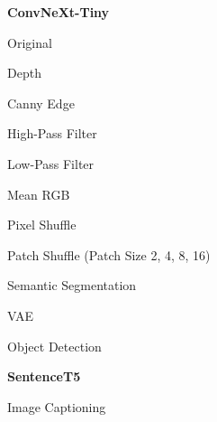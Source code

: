 \documentclass{article}
\newcommand{\todo}{\textcolor{red}{$\square$}}          %
\begin{document}
	\textbf{ConvNeXt-Tiny}
	\begin{checklist}
		\item[\todo] Original
		\item[\todo] Depth
		\item[\todo] Canny Edge
		\item[\todo] High-Pass Filter
		\item[\todo] Low-Pass Filter
		\item[\todo] Mean RGB
		\item[\todo] Pixel Shuffle
		\item[\todo] Patch Shuffle (Patch Size 2, 4, 8, 16)
		\item[\todo] Semantic Segmentation
		\item[\todo] VAE
		\item[\todo] Object Detection
	\end{checklist}
	
	\textbf{SentenceT5}
	\begin{checklist}
		\item[\todo] Image Captioning
	\end{checklist}
	
\end{document}
